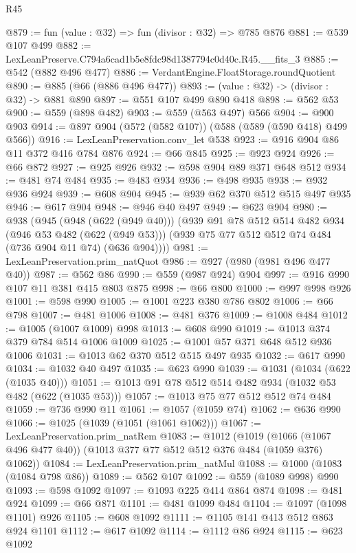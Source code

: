 \begin{lexlean}{R45}
\begin{coremodule}
@879 := fun (value : @32) => fun (divisor : @32) => @785 @876
@881 := @539 @107 @499
@882 := LexLeanPreserve.C794a6cad1b5e8fdc98d1387794c0d40c.R45.__fits_3
@885 := @542 (@882 @496 @477)
@886 := VerdantEngine.FloatStorage.roundQuotient
@890 := @885 (@66 (@886 @496 @477))
@893 := (value : @32) -> (divisor : @32) -> @881 @890
@897 := @551 @107 @499 @890 @418
@898 := @562 @53
@900 := @559 (@898 @482)
@903 := @559 (@563 @497) @566
@904 := @900 @903
@914 := @897 @904 (@572 (@582 @107)) (@588 (@589 (@590 @418) @499 @566))
@916 := LexLeanPreservation.conv_let @538
@923 := @916 @904 @86 @11 @372 @416 @784 @876
@924 := @66 @845
@925 := @923 @924
@926 := @66 @872
@927 := @925 @926
@932 := @598 @904 @89 @371 @648 @512
@934 := @481 @74 @484
@935 := @483 @934
@936 := @498 @935
@938 := @932 @936 @924
@939 := @608 @904
@945 := @939 @62 @370 @512 @515 @497 @935
@946 := @617 @904
@948 := @946 @40 @497
@949 := @623 @904
@980 := @938
    (@945
      (@948 (@622 (@949 @40)))
      (@939
        @91
        @78
        @512
        @514
        @482
        @934
        (@946 @53 @482 (@622 (@949 @53)))
        (@939 @75 @77 @512 @512 @74 @484 (@736 @904 @11 @74) (@636 @904))))
@981 := LexLeanPreservation.prim_natQuot
@986 := @927 (@980 (@981 @496 @477 @40))
@987 := @562 @86
@990 := @559 (@987 @924) @904
@997 := @916 @990 @107 @11 @381 @415 @803 @875
@998 := @66 @800
@1000 := @997 @998 @926
@1001 := @598 @990
@1005 := @1001 @223 @380 @786 @802
@1006 := @66 @798
@1007 := @481 @1006
@1008 := @481 @376
@1009 := @1008 @484
@1012 := @1005 (@1007 @1009) @998
@1013 := @608 @990
@1019 := @1013 @374 @379 @784 @514 @1006 @1009
@1025 := @1001 @57 @371 @648 @512 @936 @1006
@1031 := @1013 @62 @370 @512 @515 @497 @935
@1032 := @617 @990
@1034 := @1032 @40 @497
@1035 := @623 @990
@1039 := @1031 (@1034 (@622 (@1035 @40)))
@1051 := @1013 @91 @78 @512 @514 @482 @934 (@1032 @53 @482 (@622 (@1035 @53)))
@1057 := @1013 @75 @77 @512 @512 @74 @484
@1059 := @736 @990 @11
@1061 := @1057 (@1059 @74)
@1062 := @636 @990
@1066 := @1025 (@1039 (@1051 (@1061 @1062)))
@1067 := LexLeanPreservation.prim_natRem
@1083 := @1012
    (@1019 (@1066 (@1067 @496 @477 @40)) (@1013 @377 @77 @512 @512 @376 @484 (@1059 @376) @1062))
@1084 := LexLeanPreservation.prim_natMul
@1088 := @1000 (@1083 (@1084 @798 @86))
@1089 := @562 @107
@1092 := @559 (@1089 @998) @990
@1093 := @598 @1092
@1097 := @1093 @225 @414 @864 @874
@1098 := @481 @924
@1099 := @66 @871
@1101 := @481 @1099 @484
@1104 := @1097 (@1098 @1101) @926
@1105 := @608 @1092
@1111 := @1105 @141 @413 @512 @863 @924 @1101
@1112 := @617 @1092
@1114 := @1112 @86 @924
@1115 := @623 @1092

\end{coremodule}
\end{lexlean}

